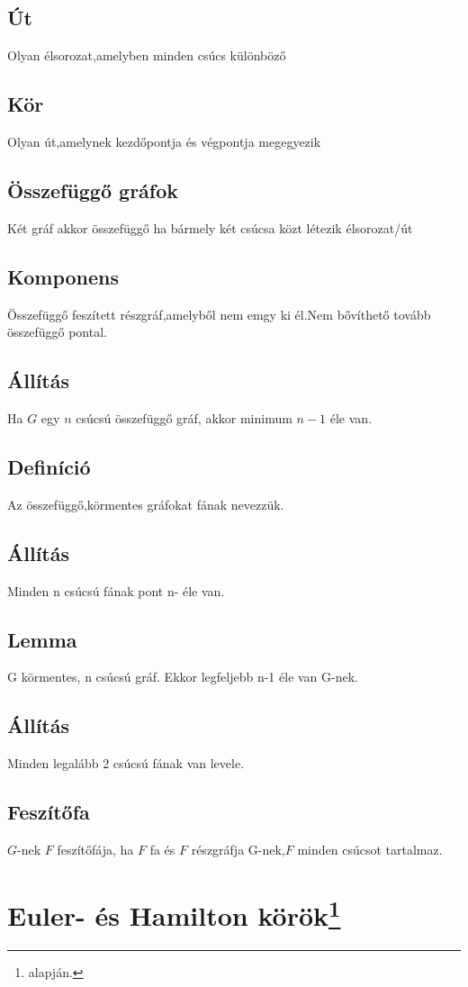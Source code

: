 \documentclass[12pt,a4paper,twoside]{report}
\begin{document}
\subsection{Út}
Olyan élsorozat,amelyben minden csúcs különböző
\subsection{Kör}
Olyan út,amelynek kezdőpontja és végpontja megegyezik
\subsection{Összefüggő gráfok}
Két gráf akkor összefüggő ha bármely két csúcsa közt létezik élsorozat/út
\subsection{Komponens}
Összefüggő feszített részgráf,amelyből nem emgy ki él.Nem bővíthető tovább összefüggő pontal.
\subsection{Állítás}
Ha $G$ egy $n$ csúcsú összefüggő gráf, akkor minimum $n-1$ éle van.
\subsection{Definíció}
Az összefüggő,körmentes gráfokat fának nevezzük.
\subsection{Állítás}
Minden n csúcsú fának pont n- éle van.
\subsection{Lemma}
G körmentes, n csúcsú gráf. Ekkor legfeljebb n-1 éle van G-nek.
\subsection{Állítás}
Minden legalább 2 csúcsú fának van levele.
\subsection{Feszítőfa}
$G$-nek $F$ feszítőfája, ha $F$ fa és $F$ részgráfja G-nek,$F$ minden csúcsot tartalmaz.
\section{Euler- és Hamilton körök\protect\footnote{\cite{kv} alapján.}}
\end{document}
